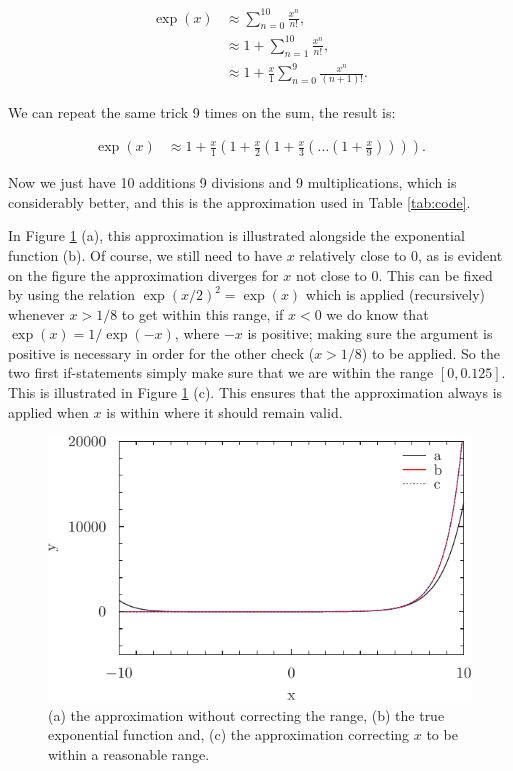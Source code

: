 \documentclass[a4paper,12pt,article]{memoir}
\begin{document}
\begin{align}
\exp(x) &\approx \sum_{n=0}^{10} \frac{x^n}{n!},\\
 &\approx 1+\sum_{n=1}^{10} \frac{x^n}{n!},\\
 &\approx 1+\frac{x}{1}\sum_{n=0}^{9} \frac{x^n}{(n+1)!}.
\end{align}

We can repeat the same trick 9 times on the sum, the result is:

\begin{align}
\exp(x) &\approx  1+\frac{x}{1}\left(1+\frac{x}{2}\left(1+\frac{x}{3}\left(\ldots\left(1+\frac{x}{9}\right)\right)\right)\right).
\end{align}

Now we just have 10 additions 9 divisions and 9 multiplications, which is considerably better, and this is the approximation used in Table \ref{tab:code}.

In Figure \ref{fig:exp} (a), this approximation is illustrated alongside the exponential function (b). Of course, we still need to have $x$ relatively close to 0, as is evident on the figure the approximation diverges for $x$ not close to $0$. This can be fixed by using the relation $\exp(x/2)^2=\exp(x)$ which is applied (recursively) whenever $x>1/8$ to get within this range, if $x<0$ we do know that $\exp(x)=1/\exp(-x)$, where $-x$ is positive; making sure the argument is positive is necessary in order for the other check ($x>1/8$) to be applied. So the two first if-statements simply make sure that we are within the range $[0,0.125]$. This is illustrated in Figure \ref{fig:exp} (c). This ensures that the approximation always is applied when $x$ is within where it should remain valid.

\begin{figure}
\includegraphics[width = 0.5\linewidth]{exp.pdf}
\caption{(a) the approximation without correcting the range, (b) the true exponential function and, (c) the approximation correcting $x$ to be within a reasonable range.}
\label{fig:exp}
\end{figure}
\end{document}
